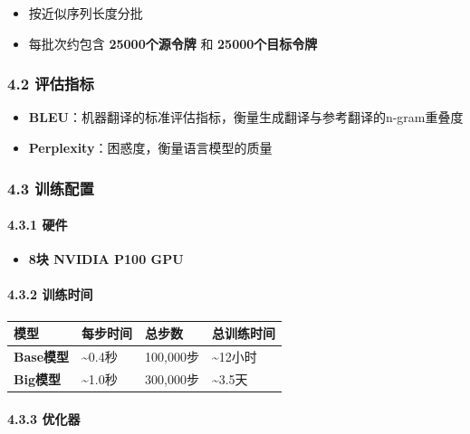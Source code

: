 \documentclass[11pt,a4paper]{article}
\begin{document}
\begin{itemize}
  \item 按近似序列长度分批
  \item 每批次约包含 \textbf{25000个源令牌} 和 \textbf{25000个目标令牌}
\end{itemize}

\subsubsection*{4.2 评估指标}

\begin{itemize}
  \item \textbf{BLEU}：机器翻译的标准评估指标，衡量生成翻译与参考翻译的n-gram重叠度
  \item \textbf{Perplexity}：困惑度，衡量语言模型的质量
\end{itemize}

\subsubsection*{4.3 训练配置}

\paragraph{4.3.1 硬件}

\begin{itemize}
  \item \textbf{8块 NVIDIA P100 GPU}
\end{itemize}

\paragraph{4.3.2 训练时间}

\begin{center}
\begin{tabular}{|l|l|l|l|}
\hline
模型 & 每步时间 & 总步数 & 总训练时间 \\
\hline
\textbf{Base模型} & \textasciitilde{}0.4秒 & 100,000步 & \textasciitilde{}12小时 \\
\hline
\textbf{Big模型} & \textasciitilde{}1.0秒 & 300,000步 & \textasciitilde{}3.5天 \\
\hline
\end{tabular}
\end{center}

\paragraph{4.3.3 优化器}
\end{document}
